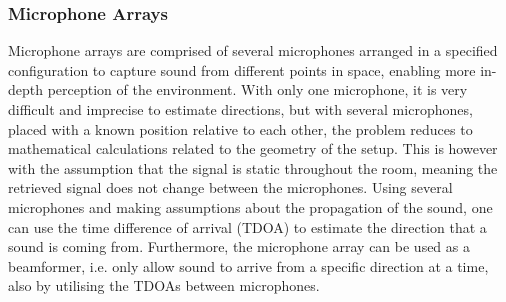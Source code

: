 \subsubsection{Microphone Arrays}
Microphone arrays are comprised of several microphones arranged in a specified configuration to capture sound from different points in space, enabling more in-depth perception of the environment. With only one microphone, it is very difficult and imprecise to estimate directions, but with several microphones, placed with a known position relative to each other, the problem reduces to mathematical calculations related to the geometry of the setup. This is however with the assumption that the signal is static throughout the room, meaning the retrieved signal does not change between the microphones. Using several microphones and making assumptions about the propagation of the sound, one can use the time difference of arrival (\gls{TDOA}) to estimate the direction that a sound is coming from. Furthermore, the microphone array can be used as a beamformer, i.e. only allow sound to arrive from a specific direction at a time, also by utilising the \gls{TDOA}s between microphones. 

